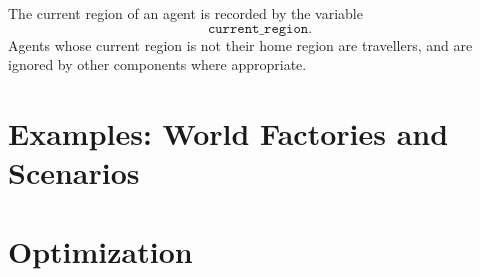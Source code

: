 \documentclass[10pt,letterpaper]{article}
\begin{document}
The current region of an agent is recorded by the variable $$\texttt{current{\_}region}.$$ Agents whose current region is not their home region are travellers, and are ignored by other components where appropriate.

\section{Examples: World Factories and Scenarios}

\section{Optimization}

% 
\end{document}
